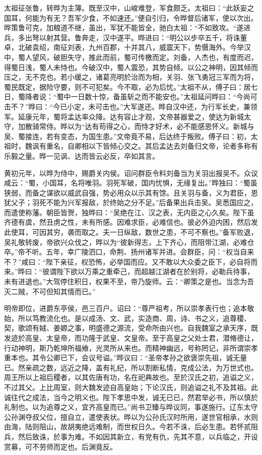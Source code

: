 \documentclass[12pt,UTF8]{ctexbook}
\begin{document}
太祖征张鲁，转晔为主簿。既至汉中，山峻难登，军食颇乏。太祖曰：“此妖妄之国耳，何能为有无？吾军少食，不如速还。”便自引归，令晔督后诸军，使以次出。晔策鲁可克，加粮道不继，虽出，军犹不能皆全，驰白太祖：“不如致攻。“遂进兵，多出弩以射其营。鲁奔走，汉中遂平。晔进曰：“明公以步卒五千，将诛董卓，北破袁绍，南征刘表，九州百郡，十并其八，威震天下，势慑海外。今举汉中，蜀人望风，破胆失守，推此而前，蜀可传檄而定。刘备，人杰也，有度而迟，得蜀日浅，蜀人未恃也。今破汉中，蜀人震恐，其势自倾。以公之神明，因其倾而压之，无不克也。若小缓之，诸葛亮明於治而为相，关羽、张飞勇冠三军而为将，蜀民既定，据险守要，则不可犯矣。今不取，必为后忧。”太祖不从，傅子曰：居七日，蜀降者说：“蜀中一日数十惊，备虽斩之而不能安也。”太祖延问晔曰：“今尚可击不？”晔曰：“今已小定，未可击也。”大军遂还。晔自汉中还，为行军长史，兼领军。延康元年，蜀将孟达率众降。达有容止才观，文帝甚器爱之，使达为新城太守，加散骑常侍。晔以为“达有苟得之心，而恃才好术，必不能感恩怀义。新城与吴、蜀接连，若有变态，为国生患。”文帝竟不易，后达终于叛败。傅子曰：初，太祖时，魏讽有重名，自卿相以下皆倾心交之。其后孟达去刘备归文帝，论者多称有乐毅之量。晔一见讽、达而皆云必反，卒如其言。

黄初元年，以晔为侍中，赐爵关内侯。诏问群臣令料刘备当为关羽出报吴不。众议咸云：“蜀，小国耳，名将唯羽。羽死军破，国内忧惧，无缘复出。”晔独曰：“蜀虽狭弱，而备之谋欲以威武自强，势必用众以示其有馀。且关羽与备，义为君臣，恩犹父子；羽死不能为兴军报敌，於终始之分不足。”后备果出兵击吴。吴悉国应之，而遣使称藩。朝臣皆贺，独晔曰：“吴绝在江、汉之表，无内臣之心久矣。陛下虽齐德有虞，然丑虏之性，未有所感。因难求臣，必难信也。彼必外迫内困，然后发此使耳，可因其穷，袭而取之。夫一日纵敌，数世之患，不可不察也。”备军败退，吴礼敬转废，帝欲兴众伐之，晔以为“彼新得志，上下齐心，而阻带江湖，必难仓卒。”帝不听。五年，幸广陵泗口，命荆、扬州诸军并进。会群臣，问：“权当自来不？”咸曰：“陛下亲征，权恐怖，必举国而应。又不敢以大众委之臣下，必自将而来。”晔曰：“彼谓陛下欲以万乘之重牵己，而超越江湖者在於别将，必勒兵待事，未有进退也。”大驾停住积日，权果不至，帝乃旋师。云：“卿策之是也。当念为吾灭二贼，不可但知其情而已。”

明帝即位，进爵东亭侯，邑三百户。诏曰：“尊严祖考，所以崇孝表行也；追本敬始，所以笃教流化也。是以成汤、文、武，实造商、周，诗、书之义，追尊稷、契，歌颂有娀、姜嫄之事，明盛德之源流，受命所由兴也。自我魏室之承天序，既发迹於高皇、太皇帝，而功隆于武皇、文皇帝。至于高皇之父处士君，潜脩德让，行动神明，斯乃乾坤所福飨，光灵所从来也。而精神幽远，号称罔记，非所谓崇孝重本也。其令公卿已下，会议号谥。”晔议曰：“圣帝孝孙之欲褒崇先祖，诚无量已。然亲疏之数，远近之降，盖有礼纪，所以割断私情，克成公法，为万世式也。周王所以上祖后稷者，以其佐唐有功，名在祀典故也。至於汉氏之初，追谥之义，不过其父。上比周室，则大魏发迹自高皇始；下论汉氏，则追谥之礼不及其祖。此诚往代之成法，当今之明义也。陛下孝思中发，诚无已已，然君举必书，所以慎於礼制也。以为追尊之义，宜齐高皇而已。”尚书卫臻与晔议同，事遂施行。辽东太守公孙渊夺叔父位，擅自立，遣使表状。晔以为公孙氏汉时所用，遂世官相承，水则由海，陆则阻山，故胡夷绝远难制，而世权日久。今若不诛，后必生患。若怀贰阻兵，然后致诛，於事为难。不如因其新立，有党有仇，先其不意，以兵临之，开设赏募，可不劳师而定也。后渊竟反。
\end{document}
